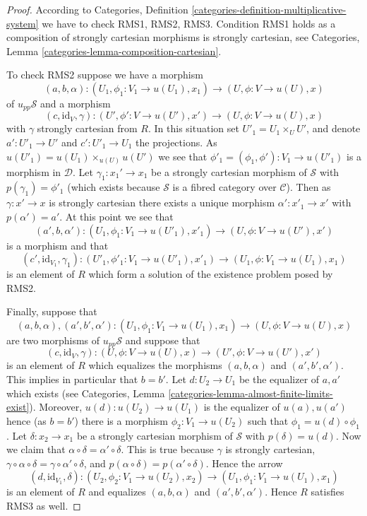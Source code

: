 \documentclass{stacks-project}
\theoremstyle{plain}
\theoremstyle{definition}
\theoremstyle{remark}
\numberwithin{equation}{subsection}
\begin{document}
\begin{proof}
According to
Categories, Definition \ref{categories-definition-multiplicative-system}
we have to check RMS1, RMS2, RMS3.
Condition RMS1 holds as a composition of strongly cartesian morphisms is
strongly cartesian, see
Categories, Lemma \ref{categories-lemma-composition-cartesian}.

\medskip\noindent
To check RMS2 suppose we have a morphism
$$
(a, b, \alpha) :
(U_1, \phi_1 : V_1 \to u(U_1), x_1)
\longrightarrow
(U, \phi : V \to u(U), x)
$$
of $u_{pp}\mathcal{S}$ and a morphism
$$
(c, \text{id}_V, \gamma) :
(U', \phi' : V \to u(U'), x')
\longrightarrow
(U, \phi : V \to u(U), x)
$$
with $\gamma$ strongly cartesian from $R$. In this situation set
$U'_1 = U_1 \times_U U'$, and denote $a' : U'_1 \to U'$ and
$c' : U'_1 \to U_1$ the projections.
As $u(U'_1) = u(U_1) \times_{u(U)} u(U')$
we see that $\phi'_1 = (\phi_1, \phi') : V_1 \to u(U'_1)$ is
a morphism in $\mathcal{D}$. Let $\gamma_1 : x_1' \to x_1$
be a strongly cartesian morphism of $\mathcal{S}$ with
$p(\gamma_1) = \phi'_1$ (which exists because $\mathcal{S}$ is a
fibred category over $\mathcal{C}$). Then as $\gamma : x' \to x$ is
strongly cartesian there exists a unique morphism
$\alpha' : x'_1 \to x'$ with $p(\alpha') = a'$.
At this point we see that
$$
(a', b, \alpha') :
(U_1, \phi_1 : V_1 \to u(U'_1), x'_1)
\longrightarrow
(U, \phi : V \to u(U'), x')
$$
is a morphism and that
$$
(c', \text{id}_{V_1}, \gamma_1) :
(U'_1, \phi'_1 : V_1 \to u(U'_1), x'_1)
\longrightarrow
(U_1, \phi : V_1 \to u(U_1), x_1)
$$
is an element of $R$ which form a solution of the existence problem
posed by RMS2.

\medskip\noindent
Finally, suppose that
$$
(a, b, \alpha), (a', b', \alpha') :
(U_1, \phi_1 : V_1 \to u(U_1), x_1)
\longrightarrow
(U, \phi : V \to u(U), x)
$$
are two morphisms of $u_{pp}\mathcal{S}$ and suppose that
$$
(c, \text{id}_V, \gamma) :
(U, \phi : V \to u(U), x)
\longrightarrow
(U', \phi : V \to u(U'), x')
$$
is an element of $R$ which equalizes the morphisms
$(a, b, \alpha)$ and $(a', b', \alpha')$. This implies in particular
that $b = b'$. Let $d : U_2 \to U_1$ be the equalizer of $a, a'$ which
exists (see
Categories, Lemma \ref{categories-lemma-almost-finite-limits-exist}).
Moreover, $u(d) : u(U_2) \to u(U_1)$ is the equalizer of $u(a), u(a')$
hence (as $b = b'$) there is a morphism $\phi_2 : V_1 \to u(U_2)$ such that
$\phi_1 = u(d) \circ \phi_1$. Let $\delta : x_2 \to x_1$ be a strongly
cartesian morphism of $\mathcal{S}$ with $p(\delta) = u(d)$.
Now we claim that $\alpha \circ \delta = \alpha' \circ \delta$.
This is true because
$\gamma$ is strongly cartesian,
$\gamma \circ \alpha \circ \delta = \gamma \circ \alpha' \circ \delta$, and
$p(\alpha \circ \delta) = p(\alpha' \circ \delta)$.
Hence the arrow
$$
(d, \text{id}_{V_1}, \delta) :
(U_2, \phi_2 : V_1 \to u(U_2), x_2)
\longrightarrow
(U_1, \phi_1 : V_1 \to u(U_1), x_1)
$$
is an element of $R$ and equalizes $(a, b, \alpha)$ and $(a', b', \alpha')$.
Hence $R$ satisfies RMS3 as well.
\end{proof}
\end{document}
